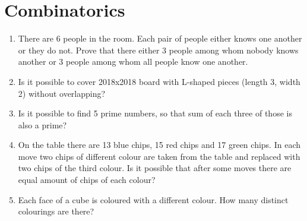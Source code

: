 \documentclass{article}
\begin{document}
	\section{Combinatorics}
	\begin{enumerate}
		\item
		There are 6 people in the room. Each pair of people either knows one another or they do not. Prove that there either 3 people among whom nobody knows another or 3 people among whom all people know one another.
		\item
		Is it possible to cover 2018x2018 board with L-shaped pieces (length 3, width 2) without overlapping?
		\item
		Is it possible to find 5 prime numbers, so that sum of each three of those is also a prime?
		
		\item
		On the table there are 13 blue chips, 15 red chips and 17 green chips. In each move two chips of different colour are taken from the table and replaced with two chips of the third colour. Is it possible that after some moves there are equal amount of chips of each colour?
		
		\item
		Each face of a cube is coloured with a different colour. How many distinct colourings are there?
		 
	\end{enumerate}
	
\end{document}
